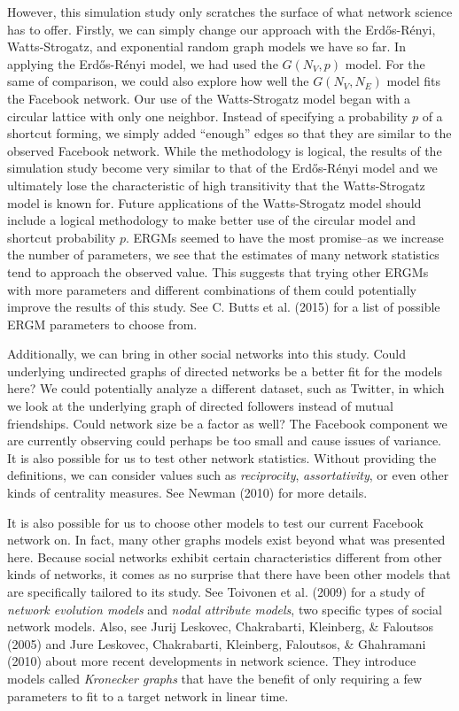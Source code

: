 \documentclass[12pt,twoside]{amherstthesis}
\begin{document}
  However, this simulation study only scratches the surface of what
  network science has to offer. Firstly, we can simply change our approach
  with the Erdős-Rényi, Watts-Strogatz, and exponential random graph
  models we have so far. In applying the Erdős-Rényi model, we had used
  the \(G(N_{V}, p)\) model. For the same of comparison, we could also
  explore how well the \(G(N_{V}, N_{E})\) model fits the Facebook
  network. Our use of the Watts-Strogatz model began with a circular
  lattice with only one neighbor. Instead of specifying a probability
  \(p\) of a shortcut forming, we simply added ``enough'' edges so that
  they are similar to the observed Facebook network. While the methodology
  is logical, the results of the simulation study become very similar to
  that of the Erdős-Rényi model and we ultimately lose the characteristic
  of high transitivity that the Watts-Strogatz model is known for. Future
  applications of the Watts-Strogatz model should include a logical
  methodology to make better use of the circular model and shortcut
  probability \(p\). ERGMs seemed to have the most promise--as we increase
  the number of parameters, we see that the estimates of many network
  statistics tend to approach the observed value. This suggests that
  trying other ERGMs with more parameters and different combinations of
  them could potentially improve the results of this study. See C. Butts
  et al. (2015) for a list of possible ERGM parameters to choose from.
  
  Additionally, we can bring in other social networks into this study.
  Could underlying undirected graphs of directed networks be a better fit
  for the models here? We could potentially analyze a different dataset,
  such as Twitter, in which we look at the underlying graph of directed
  followers instead of mutual friendships. Could network size be a factor
  as well? The Facebook component we are currently observing could perhaps
  be too small and cause issues of variance. It is also possible for us to
  test other network statistics. Without providing the definitions, we can
  consider values such as \emph{reciprocity}, \emph{assortativity}, or
  even other kinds of centrality measures. See Newman (2010) for more
  details.
  
  It is also possible for us to choose other models to test our current
  Facebook network on. In fact, many other graphs models exist beyond what
  was presented here. Because social networks exhibit certain
  characteristics different from other kinds of networks, it comes as no
  surprise that there have been other models that are specifically
  tailored to its study. See Toivonen et al. (2009) for a study of
  \emph{network evolution models} and \emph{nodal attribute models}, two
  specific types of social network models. Also, see Jurij Leskovec,
  Chakrabarti, Kleinberg, \& Faloutsos (2005) and Jure Leskovec,
  Chakrabarti, Kleinberg, Faloutsos, \& Ghahramani (2010) about more
  recent developments in network science. They introduce models called
  \emph{Kronecker graphs} that have the benefit of only requiring a few
  parameters to fit to a target network in linear time.
  
\end{document}
